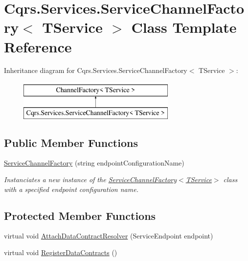 \hypertarget{classCqrs_1_1Services_1_1ServiceChannelFactory}{}\section{Cqrs.\+Services.\+Service\+Channel\+Factory$<$ T\+Service $>$ Class Template Reference}
\label{classCqrs_1_1Services_1_1ServiceChannelFactory}
Inheritance diagram for Cqrs.\+Services.\+Service\+Channel\+Factory$<$ T\+Service $>$\+:\begin{figure}[H]
\begin{center}
\leavevmode
\includegraphics[height=2.000000cm]{classCqrs_1_1Services_1_1ServiceChannelFactory}
\end{center}
\end{figure}
\subsection*{Public Member Functions}
\begin{DoxyCompactItemize}
\item 
\hyperlink{classCqrs_1_1Services_1_1ServiceChannelFactory_a8b483162bcc271fa8212c72e13e28f55_a8b483162bcc271fa8212c72e13e28f55}{Service\+Channel\+Factory} (string endpoint\+Configuration\+Name)
\begin{DoxyCompactList}\small\item\em Instanciates a new instance of the \hyperlink{classCqrs_1_1Services_1_1ServiceChannelFactory_a8b483162bcc271fa8212c72e13e28f55_a8b483162bcc271fa8212c72e13e28f55}{Service\+Channel\+Factory$<$\+T\+Service$>$} class with a specified endpoint configuration name. \end{DoxyCompactList}\end{DoxyCompactItemize}
\subsection*{Protected Member Functions}
\begin{DoxyCompactItemize}
\item 
virtual void \hyperlink{classCqrs_1_1Services_1_1ServiceChannelFactory_a90572d83f68b4ba72687bb8c755b0845_a90572d83f68b4ba72687bb8c755b0845}{Attach\+Data\+Contract\+Resolver} (Service\+Endpoint endpoint)
\item 
virtual void \hyperlink{classCqrs_1_1Services_1_1ServiceChannelFactory_a0ef5c8298659383821b3b8901351db42_a0ef5c8298659383821b3b8901351db42}{Register\+Data\+Contracts} ()
\end{DoxyCompactItemize}


